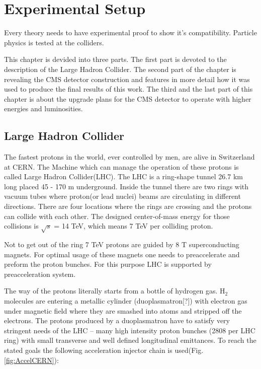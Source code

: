 \chapter{Experimental Setup}
Every theory needs to have experimental proof to show it's compatibility. Particle physics is tested at
the colliders.

This chapter is devided into three parts.
The first part is devoted to the description of the Large Hadron Collider. The second part of the 
chapter is revealing the CMS detector construction and features in more detail how it was used to produce the final
results of this work. The third and the last part of this chapter is about the upgrade plans for the
CMS detector to operate with higher energies and luminosities.

\section{Large Hadron Collider}\label{sec:LHC}

The fastest protons in the world, ever controlled by men, are alive in Switzerland at CERN.
The Machine which can manage the operation of these protons is called Large Hadron Collider(LHC). 
The LHC is a ring-shape tunnel 26.7 km long  placed 45 - 170 m underground. 
Inside the tunnel there are two rings with vacuum tubes where proton(or lead nuclei) beams are circulating in different directions.
There are four locations where the rings are crossing and the protons can collide with each other. 
The designed center-of-mass energy for those collisions is $\sqrt{s}$ = 14 TeV, which means 7 TeV per colliding proton.


Not to get out of the ring 7 TeV protons are guided by 8 T superconducting magnets. 
For optimal usage of these magnets one needs to preaccelerate and preform the proton bunches.
For this purpose LHC is supported by preacceleration system.


The way of the protons literally starts from a bottle of hydrogen gas.
H$_{2}$ molecules are entering a metallic cylinder (duoplasmatron[?]) with electron gas under magnetic field  where they are smashed 
into atoms and stripped off the electrons. The protons produced by a duoplasmatron have to satisfy very stringent needs of the LHC -- 
many high intensity proton bunches (2808 per LHC ring) with small transverse and well defined longitudinal emittances.
To reach the stated goals the following acceleration injector chain is used(Fig. \ref{fig:AccelCERN}): 

